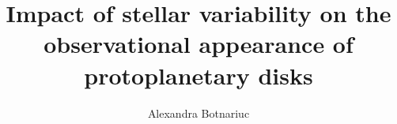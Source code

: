 \documentclass[12pt,twoside,bind,ams,a4paper]{hepthesis}
\title{Impact of stellar variability on the observational appearance of protoplanetary disks}
\author{Alexandra Botnariuc}
\begin{document}
\begin{frontmatter}

\end{frontmatter}

\begin{mainmatter}


\end{mainmatter}

\begin{appendices}

\end{appendices}

\begin{backmatter}

\end{backmatter}
\end{document}
